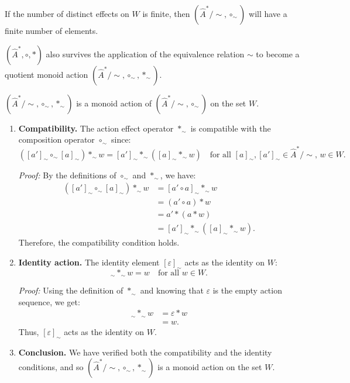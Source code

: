 If the number of distinct effects on $W$ is finite, then $(\hat{A}^{*}/\sim, \circ_{\sim})$ will have a finite number of elements.


 $(\hat{A}^{*}, \circ, \ast)$ also survives the application of the equivalence relation $\sim$ to become a quotient monoid action $(\hat{A}^{*}/\sim, \circ_{\sim}, \ast_{\sim})$.

\begin{propositionE}
    $(\hat{A}^{*}/\sim, \circ_{\sim}, \ast_{\sim})$ is a monoid action of $(\hat{A}^{*}/\sim, \circ_{\sim})$ on the set $W$.
\end{propositionE}
\begin{proofE}
\begin{enumerate}
    \item \textbf{Compatibility.}
    The action effect operator $\ast_{\sim}$ is compatible with the composition operator $\circ_{\sim}$ since:
    \begin{equation}
        ([a']_{\sim} \circ_{\sim} [a]_{\sim}) \ast_{\sim} w = [a']_{\sim} \ast_{\sim} ([a]_{\sim} \ast_{\sim} w) \quad \text{for all } [a]_{\sim}, [a']_{\sim} \in \hat{A}^{*}/\sim, \, w \in W.
    \end{equation}
    
    \textit{Proof:} By the definitions of $\circ_{\sim}$ and $\ast_{\sim}$, we have:
    \begin{align}
        ([a']_{\sim} \circ_{\sim} [a]_{\sim}) \ast_{\sim} w & = [a' \circ a]_{\sim} \ast_{\sim} w                   \\
        & = (a' \circ a) \ast w                                 \\
        & = a' \ast (a \ast w)                                  \\
        & = [a']_{\sim} \ast_{\sim} ([a]_{\sim} \ast_{\sim} w).
    \end{align}
    Therefore, the compatibility condition holds.
    
    \item \textbf{Identity action.}
    The identity element $[\varepsilon]_{\sim}$ acts as the identity on $W$:
    \begin{equation}
        [\varepsilon]_{\sim} \ast_{\sim} w = w \quad \text{for all } w \in W.
    \end{equation}
    
    \textit{Proof:} Using the definition of $\ast_{\sim}$ and knowing that $\varepsilon$ is the empty action sequence, we get:
    \begin{align}
        [\varepsilon]_{\sim} \ast_{\sim} w & = \varepsilon \ast w \\
        & = w.
    \end{align}
    Thus, $[\varepsilon]_{\sim}$ acts as the identity on $W$.
    
    \item \textbf{Conclusion.}
    We have verified both the compatibility and the identity conditions, and so $(\hat{A}^{*}/\sim, \circ_{\sim}, \ast_{\sim})$ is a monoid action on the set $W$.
\end{enumerate}
\end{proofE}


